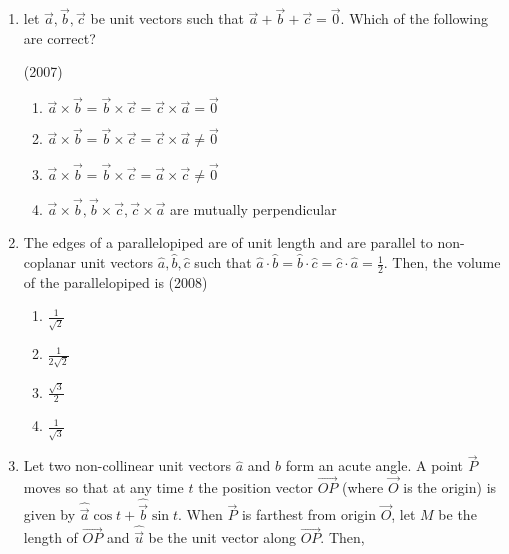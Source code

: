 \begin{enumerate}[label=\thesubsection.\arabic*.,ref=\thesubsection.\theenumi]
    \hfill{(2007)}
    \begin{multicols}{4} 
    	\begin{enumerate}
    		\item $1$
    		\item $2$
    		\item $3$
    		\item $4$
    	\end{enumerate}
    \end{multicols}
    \item let $\vec{a}, \vec{b}, \vec{c}$ be unit vectors such that $\vec{a}+\vec{b}+\vec{c}=\vec{0}$. Which of the following are correct?

    \hfill{(2007)}
    \begin{enumerate}
    	\item $\vec{a} \times \vec{b} = \vec{b} \times \vec{c} = \vec{c} \times \vec{a} = \vec{0}$
    	\item $\vec{a} \times \vec{b} = \vec{b} \times \vec{c} = \vec{c} \times \vec{a} \neq \vec{0}$
    	\item $\vec{a} \times \vec{b} = \vec{b} \times \vec{c} = \vec{a} \times \vec{c} \neq \vec{0}$
    	\item $\vec{a} \times \vec{b}, \vec{b} \times \vec{c}, \vec{c} \times \vec{a}$ are mutually perpendicular
    \end{enumerate}
    \item The edges of a parallelopiped are of unit length and are parallel to non-coplanar unit vectors $\hat{a},\hat{b},\hat{c}$ such that $\hat{a} \cdot \hat{b}= \hat{b} \cdot \hat{c}= \hat{c} \cdot \hat{a}= \frac{1}{2}$. Then, the volume of the parallelopiped is 
    \hfill{(2008)}
    \begin{multicols}{4}
    	\begin{enumerate}
    		\item $\frac{1}{\sqrt{2}}$
    		\item $\frac{1}{2\sqrt{2}}$
    		\item $\frac{\sqrt{3}}{2}$
    		\item $\frac{1}{\sqrt{3}}$
    	\end{enumerate}
    \end{multicols}
    \item Let two non-collinear unit vectors $\hat{a}$ and $\hat{b}$ form an acute angle. A point $\vec{P}$ moves so that at any time $t$ the position vector $\overrightarrow{OP}$ (where $\vec{O}$ is the origin) is given by $\hat{\vec{a}}\cos{t} + \hat{\vec{b}}\sin{t}$. When $\vec{P}$ is farthest from origin $\vec{O}$, let $M$ be the length of $\overrightarrow{OP}$ and $\hat{\vec{u}}$ be the unit vector along $\overrightarrow{OP}$. Then,

\end{enumerate}
